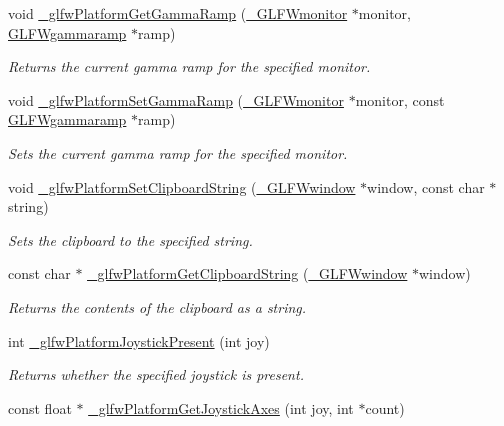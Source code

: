 \begin{DoxyCompactItemize}
\item 
void \hyperlink{group__platform_ga8b200c0ce0ac89e118ba1fe502c58c81}{\+\_\+glfw\+Platform\+Get\+Gamma\+Ramp} (\hyperlink{struct__GLFWmonitor}{\+\_\+\+G\+L\+F\+Wmonitor} $\ast$monitor, \hyperlink{structGLFWgammaramp}{G\+L\+F\+Wgammaramp} $\ast$ramp)
\begin{DoxyCompactList}\small\item\em Returns the current gamma ramp for the specified monitor. \end{DoxyCompactList}\item 
void \hyperlink{group__platform_gabcaf1fc34700bd62b558caccce3ab45b}{\+\_\+glfw\+Platform\+Set\+Gamma\+Ramp} (\hyperlink{struct__GLFWmonitor}{\+\_\+\+G\+L\+F\+Wmonitor} $\ast$monitor, const \hyperlink{structGLFWgammaramp}{G\+L\+F\+Wgammaramp} $\ast$ramp)
\begin{DoxyCompactList}\small\item\em Sets the current gamma ramp for the specified monitor. \end{DoxyCompactList}\item 
void \hyperlink{group__platform_gabf3b7b168b64bb1abbfc17e93d0c5014}{\+\_\+glfw\+Platform\+Set\+Clipboard\+String} (\hyperlink{struct__GLFWwindow}{\+\_\+\+G\+L\+F\+Wwindow} $\ast$window, const char $\ast$string)
\begin{DoxyCompactList}\small\item\em Sets the clipboard to the specified string. \end{DoxyCompactList}\item 
const char $\ast$ \hyperlink{group__platform_ga8a498c1b06756ed10baed476e2b0ffc5}{\+\_\+glfw\+Platform\+Get\+Clipboard\+String} (\hyperlink{struct__GLFWwindow}{\+\_\+\+G\+L\+F\+Wwindow} $\ast$window)
\begin{DoxyCompactList}\small\item\em Returns the contents of the clipboard as a string. \end{DoxyCompactList}\item 
int \hyperlink{group__platform_ga022d0cd34e122cef768f557c755fec9c}{\+\_\+glfw\+Platform\+Joystick\+Present} (int joy)
\begin{DoxyCompactList}\small\item\em Returns whether the specified joystick is present. \end{DoxyCompactList}\item 
const float $\ast$ \hyperlink{group__platform_ga40a4d841bb3764d04f7ec9c7390de702}{\+\_\+glfw\+Platform\+Get\+Joystick\+Axes} (int joy, int $\ast$count)

\end{DoxyCompactItemize}
